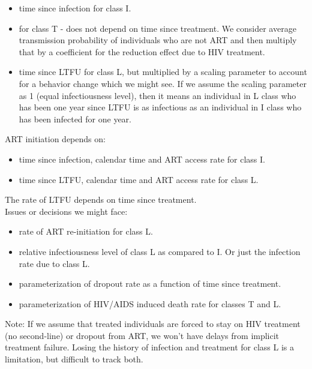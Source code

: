 \documentclass[a4paper,12pt]{article}
\begin{document}
\begin{itemize}
 \item time since infection for class I.
 \item for class T - does not depend on time since treatment. We consider average transmission probability of individuals who are not ART and then multiply that by a coefficient for the reduction effect due to HIV treatment. 
 \item time since LTFU for class L, but multiplied by a scaling parameter to account for a behavior change which we might see. If we assume the scaling parameter as 1 (equal infectiousness level), then it means an individual in L class who has been one year since LTFU is as infectious as an individual in I class who has been infected for one year.
\end{itemize}
 
 ART initiation depends on:
 \begin{itemize}
  \item time since infection, calendar time and ART access rate for class I.
  \item time since LTFU, calendar time and ART access rate for class L.
 \end{itemize}

 The rate of LTFU depends on time since treatment. \\ 
 
 Issues or decisions we might face:
 \begin{itemize}
  \item rate of ART re-initiation for class L.
  \item relative infectiousness level of class L as compared to I. Or just the infection rate due to class L.
  \item parameterization of dropout rate as a function of time since treatment.
  \item parameterization of HIV/AIDS induced death rate for classes T and L.
 \end{itemize}

 Note: If we assume that treated individuals are forced to stay on HIV treatment (no second-line) or dropout from ART, we won't have delays from implicit treatment failure. Losing the history of infection and treatment for class L is a limitation, but difficult to track both. 

 
\end{document}
